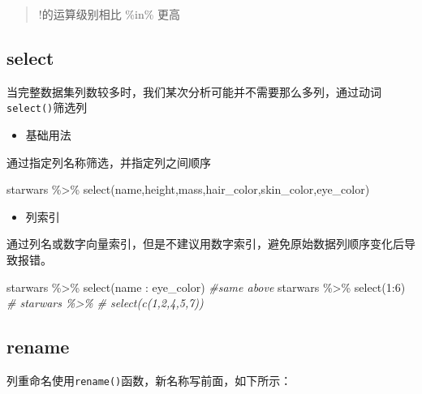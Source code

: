 \documentclass[
]{book}
\newenvironment{Shaded}{\begin{snugshade}}{\end{snugshade}}
\newcommand{\CommentTok}[1]{\textcolor[rgb]{0.56,0.35,0.01}{\textit{#1}}}
\newcommand{\DecValTok}[1]{\textcolor[rgb]{0.00,0.00,0.81}{#1}}
\newcommand{\FunctionTok}[1]{\textcolor[rgb]{0.00,0.00,0.00}{#1}}
\newcommand{\NormalTok}[1]{#1}
\newcommand{\SpecialCharTok}[1]{\textcolor[rgb]{0.00,0.00,0.00}{#1}}
\providecommand{\tightlist}{%
  \setlength{\itemsep}{0pt}\setlength{\parskip}{0pt}}
\begin{document}
\begin{quote}
!的运算级别相比 \%in\% 更高
\end{quote}

\hypertarget{select}{%
\subsection{select}\label{select}}

当完整数据集列数较多时，我们某次分析可能并不需要那么多列，通过动词\texttt{select()}筛选列

\begin{itemize}
\tightlist
\item
  基础用法
\end{itemize}

通过指定列名称筛选，并指定列之间顺序

\begin{Shaded}
\begin{Highlighting}[]
\NormalTok{starwars }\SpecialCharTok{\%\textgreater{}\%} 
  \FunctionTok{select}\NormalTok{(name,height,mass,hair\_color,skin\_color,eye\_color)}
\end{Highlighting}
\end{Shaded}

\begin{itemize}
\tightlist
\item
  列索引
\end{itemize}

通过列名或数字向量索引，但是不建议用数字索引，避免原始数据列顺序变化后导致报错。

\begin{Shaded}
\begin{Highlighting}[]
\NormalTok{starwars }\SpecialCharTok{\%\textgreater{}\%} 
  \FunctionTok{select}\NormalTok{(name }\SpecialCharTok{:}\NormalTok{ eye\_color)}
\CommentTok{\#same above}
\NormalTok{starwars }\SpecialCharTok{\%\textgreater{}\%} 
  \FunctionTok{select}\NormalTok{(}\DecValTok{1}\SpecialCharTok{:}\DecValTok{6}\NormalTok{)}
\CommentTok{\# starwars \%\textgreater{}\% }
\CommentTok{\#   select(c(1,2,4,5,7))}
\end{Highlighting}
\end{Shaded}

\hypertarget{rename}{%
\subsection{rename}\label{rename}}

列重命名使用\texttt{rename()}函数，新名称写前面，如下所示：
\end{document}
